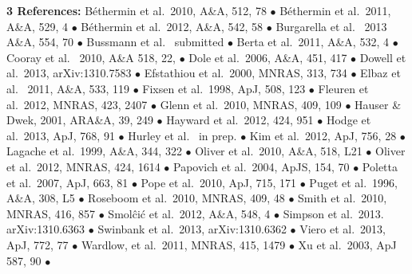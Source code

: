 \documentclass[12pt,a4paper]{article}
\begin{document}
\vspace{0.2cm}
{\large{\bf 3 References:}}
{\small
B\'ethermin et al.\ 2010, A\&A, 512, 78 $\bullet$
B\'ethermin et al.\ 2011, A\&A, 529, 4 $\bullet$ 
B\'ethermin et al.\ 2012, A\&A, 542, 58 $\bullet$
Burgarella et al. \ 2013 A\&A, 554, 70 $\bullet$
Bussmann et al. \ submitted $\bullet$
Berta et al.\ 2011, A\&A, 532, 4 $\bullet$
Cooray et al. \ 2010, A\&A 518, 22, $\bullet$
Dole et al.\ 2006, A\&A, 451, 417 $\bullet$
Dowell et al.\ 2013, arXiv:1310.7583 $\bullet$
Efstathiou et al.\ 2000, MNRAS, 313, 734 $\bullet$
Elbaz et al. \ 2011, A\&A, 533, 119 $\bullet$
Fixsen et al.\ 1998, ApJ, 508, 123 $\bullet$
Fleuren et al.\ 2012, MNRAS, 423, 2407 $\bullet$
Glenn et al.\ 2010, MNRAS, 409, 109 $\bullet$
Hauser \& Dwek, 2001, ARA\&A, 39, 249 $\bullet$
Hayward et al.\ 2012, 424, 951 $\bullet$
Hodge et al.\ 2013, ApJ, 768, 91 $\bullet$
Hurley et al. \ in prep. $\bullet$
Kim et al.\ 2012, ApJ, 756, 28 $\bullet$
Lagache et al.\ 1999, A\&A, 344, 322 $\bullet$
Oliver et al.\ 2010, A\&A, 518, L21 $\bullet$
Oliver et al.\ 2012, MNRAS, 424, 1614 $\bullet$
Papovich et al.\ 2004, ApJS, 154, 70 $\bullet$
Poletta et al.\ 2007, ApJ, 663, 81 $\bullet$
Pope et al.\ 2010, ApJ, 715, 171 $\bullet$
Puget et al.\ 1996, A\&A, 308, L5 $\bullet$
Roseboom et al.\ 2010, MNRAS, 409, 48 $\bullet$
Smith et al.\ 2010, MNRAS, 416, 857 $\bullet$
Smol\^ci\'c et al.\ 2012, A\&A, 548, 4 $\bullet$
Simpson et al.\ 2013. arXiv:1310.6363 $\bullet$
Swinbank et al.\ 2013, arXiv:1310.6362 $\bullet$
Viero et al.\ 2013, ApJ, 772, 77 $\bullet$
Wardlow, et al.\ 2011, MNRAS, 415, 1479 $\bullet$
Xu et al.\ 2003, ApJ 587, 90 $\bullet$
}


\end{document}
